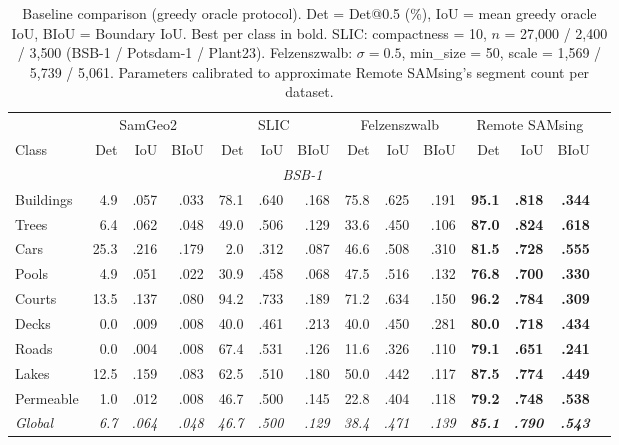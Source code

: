 \documentclass[review,11pt,authoryear]{elsarticle}
\begin{document}
\begin{table}[htbp]
\centering
\caption{Baseline comparison (greedy oracle protocol). Det = Det@0.5 (\%), IoU = mean greedy oracle IoU, BIoU = Boundary IoU. Best per class in bold. SLIC: compactness = 10, $n$ = 27{,}000 / 2{,}400 / 3{,}500 (BSB-1 / Potsdam-1 / Plant23). Felzenszwalb: $\sigma = 0.5$, min\_size = 50, scale = 1{,}569 / 5{,}739 / 5{,}061. Parameters calibrated to approximate Remote SAMsing's segment count per dataset.}
\label{tab:baselines}
\scriptsize
\begin{tabular}{lrrrrrrrrrrrrr}
\toprule
 & \multicolumn{3}{c}{SamGeo2} & \multicolumn{3}{c}{SLIC} & \multicolumn{3}{c}{Felzenszwalb} & \multicolumn{3}{c}{Remote SAMsing} \\
\cmidrule(lr){2-4} \cmidrule(lr){5-7} \cmidrule(lr){8-10} \cmidrule(lr){11-13}
Class & Det & IoU & BIoU & Det & IoU & BIoU & Det & IoU & BIoU & Det & IoU & BIoU \\
\midrule
\multicolumn{13}{c}{\footnotesize\textit{BSB-1}} \\
\midrule
Buildings &  4.9 & .057 & .033 & 78.1 & .640 & .168 & 75.8 & .625 & .191 & \textbf{95.1} & \textbf{.818} & \textbf{.344} \\
Trees     &  6.4 & .062 & .048 & 49.0 & .506 & .129 & 33.6 & .450 & .106 & \textbf{87.0} & \textbf{.824} & \textbf{.618} \\
Cars      & 25.3 & .216 & .179 &  2.0 & .312 & .087 & 46.6 & .508 & .310 & \textbf{81.5} & \textbf{.728} & \textbf{.555} \\
Pools     &  4.9 & .051 & .022 & 30.9 & .458 & .068 & 47.5 & .516 & .132 & \textbf{76.8} & \textbf{.700} & \textbf{.330} \\
Courts    & 13.5 & .137 & .080 & 94.2 & .733 & .189 & 71.2 & .634 & .150 & \textbf{96.2} & \textbf{.784} & \textbf{.309} \\
Decks     &  0.0 & .009 & .008 & 40.0 & .461 & .213 & 40.0 & .450 & .281 & \textbf{80.0} & \textbf{.718} & \textbf{.434} \\
Roads     &  0.0 & .004 & .008 & 67.4 & .531 & .126 & 11.6 & .326 & .110 & \textbf{79.1} & \textbf{.651} & \textbf{.241} \\
Lakes     & 12.5 & .159 & .083 & 62.5 & .510 & .180 & 50.0 & .442 & .117 & \textbf{87.5} & \textbf{.774} & \textbf{.449} \\
Permeable &  1.0 & .012 & .008 & 46.7 & .500 & .145 & 22.8 & .404 & .118 & \textbf{79.2} & \textbf{.748} & \textbf{.538} \\
\textit{Global} & \textit{6.7} & \textit{.064} & \textit{.048} & \textit{46.7} & \textit{.500} & \textit{.129} & \textit{38.4} & \textit{.471} & \textit{.139} & \textit{\textbf{85.1}} & \textit{\textbf{.790}} & \textit{\textbf{.543}} \\

\end{tabular}
\end{table}
\end{document}
